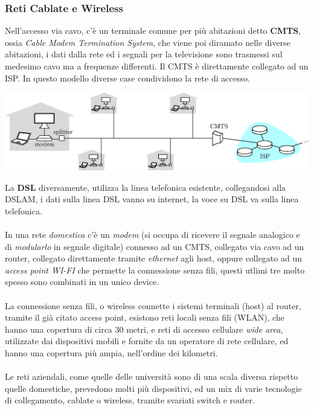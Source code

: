 \documentclass[12pt, letterpaper]{article}
\newcommand{\acc}{\\\hphantom{}\\}
\begin{document}
\subsubsection{Reti Cablate e Wireless}
Nell'accesso via cavo, c'è un terminale comune per più abitazioni detto \textbf{CMTS}, ossia \textit{Cable Modem Termination System},
che viene poi diramato nelle diverse abitazioni, i dati dalla rete ed i segnali per la televisione sono trasmessi sul medesimo
cavo ma a frequenze differenti. Il CMTS è direttamente collegato ad un ISP. In questo modello diverse case condividono la rete di
accesso.\begin{center}
    \includegraphics[width=1.1\textwidth ]{images/cableHeadend.eps}
\end{center}
La \textbf{DSL} diversamente, utilizza la linea telefonica esistente, collegandosi alla DSLAM, i dati sulla linea
DSL vanno su internet, la voce su DSL va sulla linea telefonica. \acc
In una rete \textit{domestica}  c'è un \textit{modem}
(si occupa di ricevere il segnale analogico e di  \textit{modularlo} in segnale digitale)
connesso ad un CMTS, collegato via cavo ad
un router, collegato direttamente tramite \textit{ethernet} agli host, oppure collegato ad un \textit{access point WI-FI} che
permette la connessione senza fili, questi utlimi tre molto spesso sono combinati in un unico device.\acc
La connessione senza fili, o wireless connette i sistemi terminali (host) al router, tramite il già citato
access point, esistono reti locali senza fili (WLAN), che hanno una copertura di circa 30 metri, e reti di accesso
cellulare \textit{wide area}, utilizzate dai dispositivi mobili e fornite da un operatore di rete cellulare, ed hanno una
copertura più ampia, nell'ordine dei kilometri.\acc
Le reti aziendali, come quelle delle università sono di una scala diversa rispetto quelle domestiche, prevedono molti più
dispositivi, ed un mix di varie tecnologie di collegamento, cablate o wireless, tramite svariati switch e router.
\end{document}
